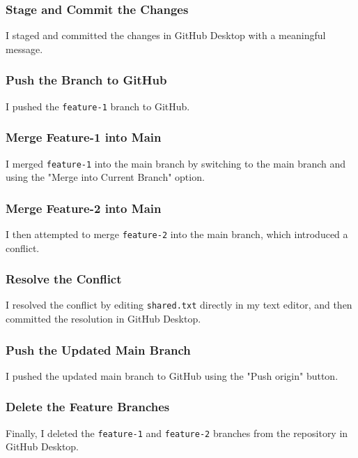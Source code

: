 \subsubsection{Stage and Commit the Changes}
I staged and committed the changes in GitHub Desktop with a meaningful message.

\subsubsection{Push the Branch to GitHub}
I pushed the \texttt{feature-1} branch to GitHub.

\subsubsection{Merge Feature-1 into Main}
I merged \texttt{feature-1} into the main branch by switching to the main branch and using the "Merge into Current Branch" option.

\subsubsection{Merge Feature-2 into Main}
I then attempted to merge \texttt{feature-2} into the main branch, which introduced a conflict.

\subsubsection{Resolve the Conflict}
I resolved the conflict by editing \texttt{shared.txt} directly in my text editor, and then committed the resolution in GitHub Desktop.

\subsubsection{Push the Updated Main Branch}
I pushed the updated main branch to GitHub using the "Push origin" button.

\subsubsection{Delete the Feature Branches}
Finally, I deleted the \texttt{feature-1} and \texttt{feature-2} branches from the repository in GitHub Desktop.

